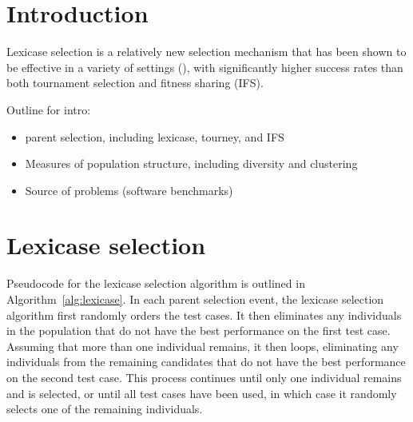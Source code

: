 \section{Introduction} \label{intro}

Lexicase selection is a relatively new selection mechanism that has been shown to be effective in a variety of
settings (\cite{Helmuth:2015:ieeeTEC,Helmuth:2015:GECCO}), with significantly higher success rates
than both tournament selection and fitness sharing (IFS).

Outline for intro:

\begin{itemize}
\item parent selection, including lexicase, tourney, and IFS

\item Measures of population structure, including diversity and clustering

\item Source of problems (software benchmarks)

\end{itemize}


\section{Lexicase selection}

	
Pseudocode for the lexicase selection algorithm is outlined in 
Algorithm~\ref{alg:lexicase}. In each parent selection event, the lexicase selection algorithm 
first randomly orders the test cases. It then eliminates any individuals in the population 
that do not have the best performance on the first test case. 
Assuming that more than one individual remains, it then loops, eliminating any individuals from 
the remaining candidates that do not have the best performance on the second test case. This 
process continues until only one individual remains and is selected, or until all test cases 
have been used, in which case it randomly selects one of the remaining individuals.

